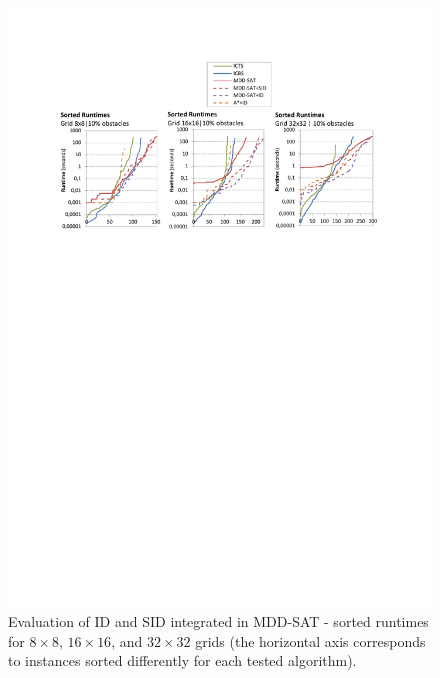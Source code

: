 \documentclass[jair,oneside,11pt]{article}
\begin{document}
\begin{figure}[h]
\centering
\includegraphics[trim={2.5cm 18.5cm 2.5cm 2.6cm},clip,width=\textwidth]{expr-id_grids-sorted.pdf}
\vspace{-0.4cm}
\caption{Evaluation of ID and SID integrated in MDD-SAT - sorted runtimes for $8{}\times{}8$, $16{}\times{}16$, and $32{}\times{}32$ grids (the horizontal axis corresponds to instances sorted differently for each tested algorithm).}
\label{expr-id_grids-sorted}
\end{figure}
\end{document}

